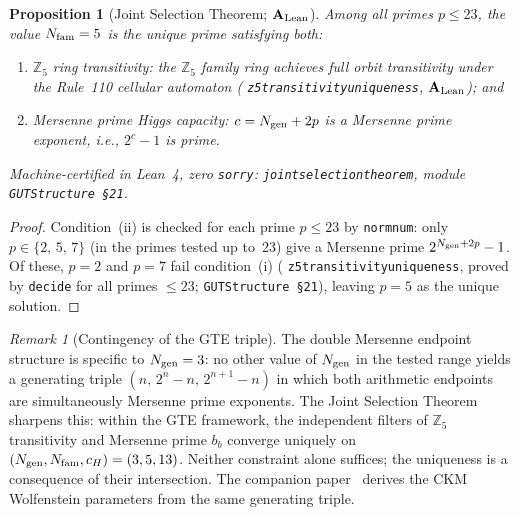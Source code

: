 \documentclass[11pt]{article}
\newtheorem{proposition}[theorem]{Proposition}
\theoremstyle{remark}
\newtheorem{remark}[theorem]{Remark}
\newcommand{\Ngen}{N_{\rm gen}}
\newcommand{\Nfam}{N_{\rm fam}}
\newcommand{\cH}{c_H}
\newcommand{\lean}[1]{%
  \penalty-100
  \begingroup\def\_{\textunderscore\allowbreak}\texttt{#1}\endgroup}
\newcommand{\CatAL}{\ensuremath{\textbf{A}_{\rm Lean}}}
\begin{document}
\begin{proposition}[Joint Selection Theorem; $\CatAL$]
\label{prop:joint_selection}
Among all primes $p \leq 23$, the value $\Nfam = 5$ is the unique prime satisfying
\emph{both}:
\begin{enumerate}[label=(\roman*)]
  \item \textit{$\mathbb{Z}_5$ ring transitivity:} the $\mathbb{Z}_5$ family ring achieves
    full orbit transitivity under the Rule~110 cellular automaton
    (\lean{z5\_transitivity\_uniqueness}, $\CatAL$); and
  \item \textit{Mersenne prime Higgs capacity:} $c = \Ngen + 2p$ is a Mersenne prime
    exponent, i.e., $2^c - 1$ is prime.
\end{enumerate}
Machine-certified in Lean~4, zero \texttt{sorry}:
\lean{joint\_selection\_theorem}, module \texttt{GUTStructure~\S21}.
\end{proposition}

\begin{proof}
Condition~(ii) is checked for each prime $p \leq 23$ by \lean{norm\_num}: only
$p \in \{2,\,5,\,7\}$ (in the primes tested up to~23) give a Mersenne prime
$2^{\Ngen + 2p} - 1$.  Of these, $p = 2$ and $p = 7$ fail condition~(i)
(\lean{z5\_transitivity\_uniqueness}, proved by \lean{decide} for all primes
$\leq 23$; \texttt{GUTStructure~\S21}), leaving $p = 5$ as the unique solution.
\end{proof}

\begin{remark}[Contingency of the GTE triple]
\label{rem:contingency}
The double Mersenne endpoint structure is specific to $\Ngen = 3$: no other value of
$\Ngen$ in the tested range yields a generating triple $(n,\,2^n - n,\,2^{n+1} - n)$
in which both arithmetic endpoints are simultaneously Mersenne prime exponents.
The Joint Selection Theorem sharpens this: within the GTE framework, the independent
filters of $\mathbb{Z}_5$ transitivity and Mersenne prime $b_b$ converge uniquely on
$(\Ngen, \Nfam, \cH) = (3, 5, 13)$.  Neither constraint alone suffices; the
uniqueness is a consequence of their intersection.
The companion paper~\cite{SpivackCKM} derives the CKM Wolfenstein parameters from the
same generating triple.
\end{remark}
\end{document}
